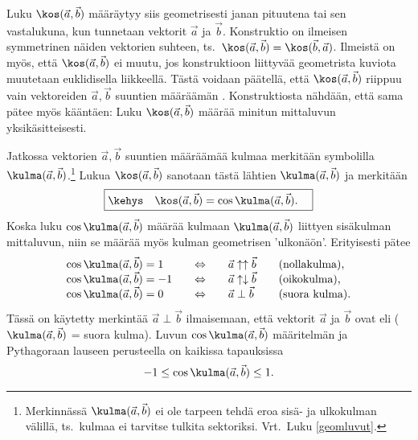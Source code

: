 Luku $\kos(\vec a,\vec b)$ määräytyy siis geometrisesti janan pituutena tai sen vastalukuna,
kun tunnetaan vektorit $\vec a$ ja $\vec b$. Konstruktio on ilmeisen symmetrinen näiden
vektorien suhteen, ts.\ $\kos(\vec a, \vec b)=\kos(\vec b, \vec a)$. Ilmeistä on myös, että
$\kos(\vec a, \vec b)$ ei muutu, jos konstruktioon liittyvää geometrista kuviota
muutetaan euklidisella liikkeellä. Tästä voidaan päätellä, että $\kos(\vec a,\vec b)$
riippuu vain vektoreiden $\vec a,\vec b$ suuntien määräämän 
. Konstruktiosta nähdään, että sama pätee myös kääntäen: Luku 
$\kos(\vec a,\vec b)$ määrää minitun mittaluvun yksikäsitteisesti.

Jatkossa vektorien $\vec a,\vec b$ suuntien määräämää kulmaa merkitään symbolilla
$\kulma(\vec a,\vec b)$.\footnote[2]{Merkinnässä $\kulma(\vec a,\vec b)$ ei ole tarpeen
tehdä eroa sisä- ja ulkokulman välillä, ts.\ kulmaa ei tarvitse tulkita sektoriksi.
Vrt.\ Luku \ref{geomluvut}.} 
Lukua $\kos(\vec a,\vec b)$ sanotaan tästä lähtien  $\kulma(\vec a,\vec b)$
 ja merkitään
%
\[
\boxed{\kehys\quad \kos(\vec a,\vec b) = \cos\kulma(\vec a,\vec b). \quad}
\]
Koska luku $\cos\kulma(\vec a, \vec b)$ määrää kulmaan $\kulma(\vec a,\vec b)$ liittyen
sisäkulman mittaluvun, niin se määrää myös kulman geometrisen 'ulkonäön'. Erityisesti pätee
\[
\begin{array}{lcll}
\cos\kulma(\vec a, \vec b) = 1 \quad  & \Leftrightarrow \quad & \vec a 
                                  \uparrow \uparrow \vec b \quad   & \text{(nollakulma),} \\
\cos\kulma(\vec a, \vec b) = -1 \quad & \Leftrightarrow \quad & \vec a 
                                  \uparrow \downarrow \vec b \quad & \text{(oikokulma),} \\
\cos\kulma(\vec a, \vec b) = 0 \quad  & \Leftrightarrow \quad & \vec a \perp \vec b \quad 
                                                                   & \text{(suora kulma).}
\end{array}
\]
Tässä on käytetty merkintää $\vec a \perp \vec b$ ilmaisemaan, että vektorit $\vec a$ ja 
$\vec b$ ovat  eli  ($\kulma(\vec a,\vec b)$ 
= suora kulma). Luvun $\cos\kulma(\vec a,\vec b)$ määritelmän ja Pythagoraan lauseen
perusteella on kaikissa tapauksissa
\begin{equation} \label{skalaari1}
-1 \le \cos\kulma(\vec a, \vec b) \leq 1.
\end{equation}
